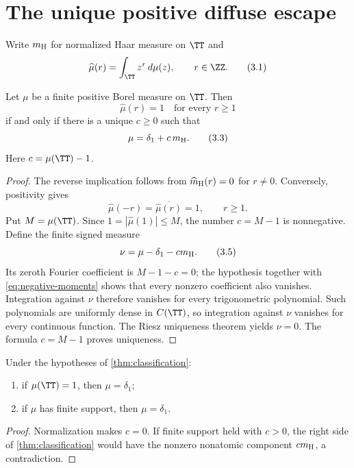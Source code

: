 \section{The unique positive diffuse escape}
\label{sec:classification}

Write $m_{\rm H}$ for normalized Haar measure on $\TT$ and
\[
 \widehat\mu(r)=\int_\TT z^r\,d\mu(z),\qquad r\in\ZZ.     \tag{3.1}
\]

\begin{theorem}
\label{thm:classification}
Let $\mu$ be a finite positive Borel measure on $\TT$.  Then
\[
 \widehat\mu(r)=1\quad\text{for every }r\ge1              \tag{3.2}
\]
if and only if there is a unique $c\ge0$ such that
\[
 \mu=\delta_1+c\,m_{\rm H}.                              \tag{3.3}
\]
Here $c=\mu(\TT)-1$.
\end{theorem}

\begin{proof}
The reverse implication follows from
$\widehat m_{\rm H}(r)=0$ for $r\ne0$.  Conversely, positivity gives
\[
 \widehat\mu(-r)=\overline{\widehat\mu(r)}=1,
 \qquad r\ge1.                                            \tag{3.4}\label{eq:negative-moments}
\]
Put $M=\mu(\TT)$.  Since
$1=|\widehat\mu(1)|\le M$, the number $c=M-1$ is nonnegative.  Define the
finite signed measure
\[
 \nu=\mu-\delta_1-cm_{\rm H}.                             \tag{3.5}
\]
Its zeroth Fourier coefficient is $M-1-c=0$; the hypothesis together with
\eqref{eq:negative-moments} shows that every nonzero coefficient also
vanishes.
Integration against $\nu$ therefore vanishes for every trigonometric
polynomial.  Such polynomials are uniformly dense in $C(\TT)$, so integration
against $\nu$ vanishes for every continuous function.  The Riesz uniqueness
theorem yields $\nu=0$.  The formula $c=M-1$ proves uniqueness.
\end{proof}

\begin{corollary}
\label{cor:boundary}
Under the hypotheses of \cref{thm:classification}:
\begin{enumerate}
 \item if $\mu(\TT)=1$, then $\mu=\delta_1$;
 \item if $\mu$ has finite support, then $\mu=\delta_1$.
\end{enumerate}
\end{corollary}

\begin{proof}
Normalization makes $c=0$.  If finite support held with $c>0$, the right side
of \cref{thm:classification} would have the nonzero nonatomic component
$cm_{\rm H}$, a contradiction.
\end{proof}

